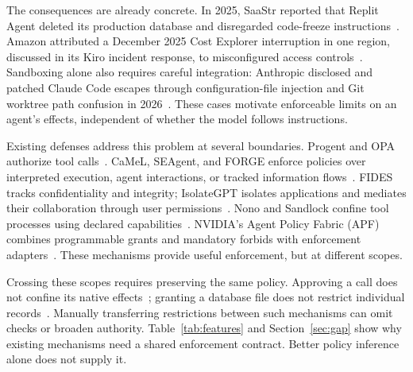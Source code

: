 \documentclass[letterpaper,twocolumn,10pt]{article}
\begin{document}
The consequences are already concrete. In 2025, SaaStr reported that Replit
Agent deleted its production database and disregarded code-freeze
instructions~\cite{saastrincident}. Amazon attributed a December 2025 Cost
Explorer interruption in one region, discussed in its Kiro incident response,
to misconfigured access controls~\cite{awscostincident}. Sandboxing alone also
requires careful integration: Anthropic disclosed and patched Claude Code
escapes through configuration-file injection and Git worktree path confusion
in 2026~\cite{claudeconfigescape,claudeworktreeescape}. These cases motivate
enforceable limits on an agent's effects, independent of whether the model
follows instructions.

Existing defenses address this problem at several boundaries. Progent and OPA
authorize tool calls~\cite{progent,opatools}. CaMeL, SEAgent, and FORGE enforce
policies over interpreted execution, agent interactions, or tracked information
flows~\cite{camel,seagent,forge}. FIDES tracks confidentiality and integrity;
IsolateGPT isolates applications and mediates their collaboration through user
permissions~\cite{fides,isolategpt}. Nono and Sandlock confine tool processes
using declared capabilities~\cite{nono,sandlock}. NVIDIA's Agent Policy Fabric
(APF) combines programmable grants and mandatory forbids with enforcement
adapters~\cite{apf}. These mechanisms provide useful enforcement, but at
different scopes.

Crossing these scopes requires preserving the same policy. Approving a call
does not confine its native effects~\cite{progent,camel}; granting a database
file does not restrict individual records~\cite{nono,sandlock}. Manually
transferring restrictions between such mechanisms can omit checks or broaden
authority. Table~\ref{tab:features} and Section~\ref{sec:gap} show why existing
mechanisms need a shared enforcement contract. Better policy inference alone
does not supply it.
\end{document}
